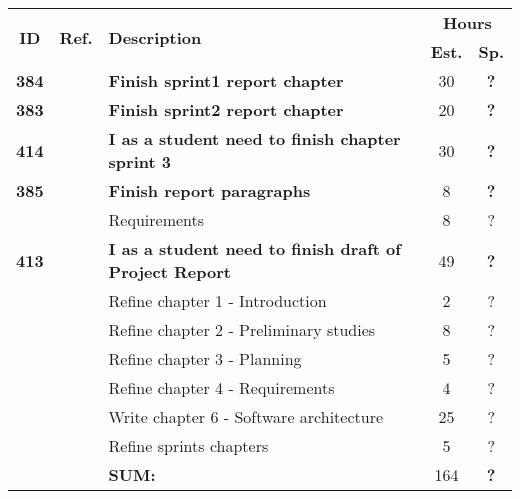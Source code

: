   \label{tab:sprint3stories}
 \def\arraystretch{1.25}
 
\begin{longtable}{ccXcc}

\toprule[0.5mm]
\multirow{2}{*}{\textbf{ID}} &
\multirow{2}{*}{\textbf{Ref.}} & \multirow{2}{*}{\textbf{Description}} & \multicolumn{2}{c}{\textbf{Hours}} \\
 					& & & \textbf{Est.} & \textbf{Sp.} \\
\midrule

\textbf{384} 	&
	& {\bf Finish sprint1 report chapter} 	
	& 30
	& \textbf{?} \\
	
\textbf{383} 	& 
	& {\bf Finish sprint2 report chapter} 	
	& 20
	& \textbf{?} \\

\textbf{414} 	&
	& {\bf I as a student need to finish  chapter sprint 3} 	
	& 30
	& \textbf{?} \\

\textbf{385} 	&
	& {\bf Finish report paragraphs} 	
	& 8	
	& \textbf{?} \\
		&& Requirements	& 8 & ? \\
\textbf{413} 	& 
	& {\bf I as a student need to finish draft of Project Report} 	
	& 49
	& \textbf{?} \\
	&& Refine chapter 1 - Introduction & 2 & ?\\
	&& Refine chapter 2 - Preliminary studies & 8 & ?\\
	&& Refine chapter 3 - Planning & 5 & ?\\
	&& Refine chapter 4 - Requirements & 4 & ?\\
	&& Write chapter 6 - Software architecture & 25 & ?\\
	&& Refine sprints chapters & 5 & ?\\

\midrule
		
				&& \textbf{SUM:}		&		164	& \textbf{?}
 \\																			
\bottomrule[0.5mm]
\end{longtable}
